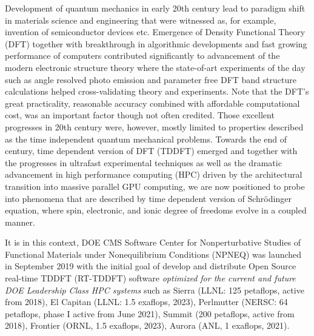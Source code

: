 Development of quantum mechanics in early 20th century lead to paradigm shift in materials science and engineering that were witnessed as, for example, invention of semiconductor devices etc. Emergence of Density Functional Theory (DFT)\cite{HohenbergKohn1964,KohnSham1965} together with breakthrough in algorithmic developments\cite{cooley1965,Cohen1975,Hamann1979,CarParrinello1985,Martin1988,Hamann1989,Vanderbilt1990,Payne1992,Bloechl1994,Klesse1999} and fast growing performance of computers contributed significantly to advancement of the modern electronic structure theory where the state-of-art experiments of the day such as angle resolved photo emission and parameter free DFT band structure calculations helped cross-validating theory and experiments. Note that the DFT's great practicality, reasonable accuracy combined with affordable computational cost, was an important factor though not often credited. Those excellent progresses in 20th century were, however, mostly limited to properties described as the time independent quantum mechanical problems. Towards the end of century, time dependent version of DFT (TDDFT) emerged \cite{RungeGross1984} and together with the progresses in ultrafast experimental techniques as well as the dramatic advancement in high performance computing (HPC) driven by the architectural transition into massive parallel GPU computing, we are now positioned to probe into phenomena that are described by time dependent version of Schr\"{o}dinger equation, where spin, electronic, and ionic degree of freedoms evolve in a coupled manner. 

It is in this context, DOE CMS Software Center for Nonperturbative Studies of Functional Materials under Nonequilibrium Conditions (NPNEQ) was launched in September 2019 with the initial goal of develop and distribute Open Source real-time TDDFT (RT-TDDFT) software {\it optimized for the current and future DOE Leadership Class HPC systems} such as Sierra (LLNL: 125 petaflops, active from 2018), El Capitan (LLNL: 1.5 exaflops, 2023), Perlmutter (NERSC: 64 petaflops, phase I active from June 2021), Summit (200 petaflops, active from 2018), Frontier (ORNL, 1.5 exaflops, 2023), Aurora (ANL, 1 exaflops, 2021). 

